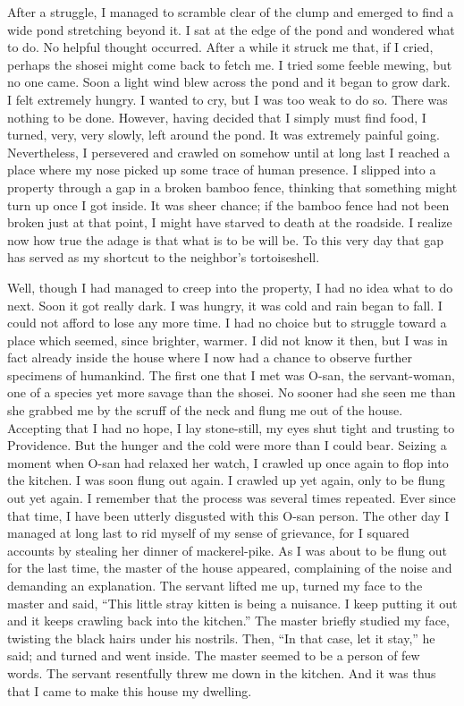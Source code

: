 \documentclass{book}
\begin{document}
After a struggle, I managed to scramble clear of the clump and emerged
to find a wide pond stretching beyond it. I sat at the edge of the pond
and wondered what to do. No helpful thought occurred. After a while it
struck me that, if I cried, perhaps the shosei might come back to fetch
me. I tried some feeble mewing, but no one came. Soon a light wind blew
across the pond and it began to grow dark. I felt extremely hungry. I
wanted to cry, but I was too weak to do so. There was nothing to be
done. However, having decided that I simply must find food, I turned,
very, very slowly, left around the pond. It was extremely painful going.
Nevertheless, I persevered and crawled on somehow until at long last I
reached a place where my nose picked up some trace of human presence. I
slipped into a property through a gap in a broken bamboo fence, thinking
that something might turn up once I got inside. It was sheer chance; if
the bamboo fence had not been broken just at that point, I might have
starved to death at the roadside. I realize now how true the adage is
that what is to be will be. To this very day that gap has served as my
shortcut to the neighbor's tortoiseshell.

Well, though I had managed to creep into the property, I had no idea
what to do next. Soon it got really dark. I was hungry, it was cold and
rain began to fall. I could not afford to lose any more time. I had no
choice but to struggle toward a place which seemed, since brighter,
warmer. I did not know it then, but I was in fact already inside the
house where I now had a chance to observe further specimens of
humankind. The first one that I met was O-san, the servant-woman, one of
a species yet more savage than the shosei. No sooner had she seen me
than she grabbed me by the scruff of the neck and flung me out of the
house. Accepting that I had no hope, I lay stone-still, my eyes shut
tight and trusting to Providence. But the hunger and the cold were more
than I could bear. Seizing a moment when O-san had relaxed her watch, I
crawled up once again to flop into the kitchen. I was soon flung out
again. I crawled up yet again, only to be flung out yet again. I
remember that the process was several times repeated. Ever since that
time, I have been utterly disgusted with this O-san person. The other
day I managed at long last to rid myself of my sense of grievance, for I
squared accounts by stealing her dinner of mackerel-pike. As I was about
to be flung out for the last time, the master of the house appeared,
complaining of the noise and demanding an explanation. The servant
lifted me up, turned my face to the master and said, ``This little stray
kitten is being a nuisance. I keep putting it out and it keeps crawling
back into the kitchen.'' The master briefly studied my face, twisting
the black hairs under his nostrils. Then, ``In that case, let it stay,''
he said; and turned and went inside. The master seemed to be a person of
few words. The servant resentfully threw me down in the kitchen. And it
was thus that I came to make this house my dwelling.
\end{document}
